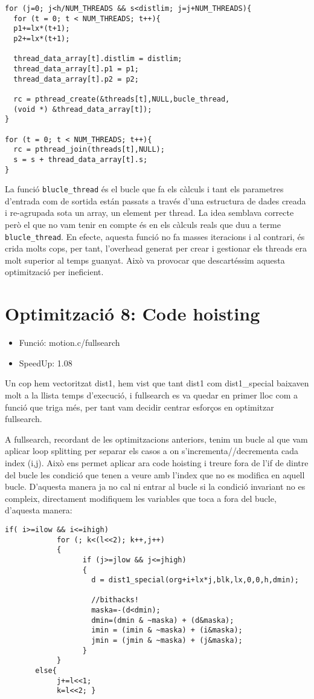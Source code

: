 \begin{lstlisting}
for (j=0; j<h/NUM_THREADS && s<distlim; j=j+NUM_THREADS){   
  for (t = 0; t < NUM_THREADS; t++){
  p1+=lx*(t+1);
  p2+=lx*(t+1);

  thread_data_array[t].distlim = distlim;
  thread_data_array[t].p1 = p1;
  thread_data_array[t].p2 = p2;

  rc = pthread_create(&threads[t],NULL,bucle_thread,
  (void *) &thread_data_array[t]);
}

for (t = 0; t < NUM_THREADS; t++){
  rc = pthread_join(threads[t],NULL);
  s = s + thread_data_array[t].s;
}		 	
\end{lstlisting}

La funció \texttt{blucle\_thread} és el bucle que fa els càlculs i tant els parametres d'entrada com de sortida están passats a través d'una estructura de dades creada i re-agrupada sota un array, un element per thread. La idea semblava correcte però el que no vam tenir en compte és en els càlculs reals que duu a terme \texttt{blucle\_thread}. En efecte, aquesta funció no fa masses iteracions i al contrari, és crida molts cops, per tant, l'overhead generat per crear i gestionar els threads era molt superior al temps guanyat. Això va provocar que descartéssim aquesta optimització per ineficient.

\section{Optimitzaci\'o 8: Code hoisting}
\begin{itemize}
\item{Funció: motion.c/fullsearch}
\item{SpeedUp: 1.08}
\end{itemize}

Un cop hem vectoritzat dist1, hem vist que tant dist1 com dist1\_special baixaven molt a la llista temps d'execució, i fullsearch es va quedar en primer lloc com a funció que triga més, per tant vam decidir centrar esforços en optimitzar fullsearch.

A fullsearch, recordant de les optimitzacions anteriors, tenim un bucle al que vam aplicar loop splitting per separar els casos a on s'incrementa//decrementa cada index (i,j). Això ens permet aplicar ara code hoisting i treure fora de l'if de dintre del bucle les condició que tenen a veure amb l'index que no es modifica en aquell bucle. D'aquesta manera ja no cal ni entrar al bucle si la condició invariant no es compleix, directament modifiquem les variables que toca a fora del bucle, d'aquesta manera:

\begin{lstlisting}
if( i>=ilow && i<=ihigh)
            for (; k<(l<<2); k++,j++)
            {
                  if (j>=jlow && j<=jhigh)
                  {
                    d = dist1_special(org+i+lx*j,blk,lx,0,0,h,dmin);

                    //bithacks!
                    maska=-(d<dmin);
                    dmin=(dmin & ~maska) + (d&maska);
                    imin = (imin & ~maska) + (i&maska);
                    jmin = (jmin & ~maska) + (j&maska);
                  }
            }
       else{
            j+=l<<1;
            k=l<<2;	}	 	
\end{lstlisting}